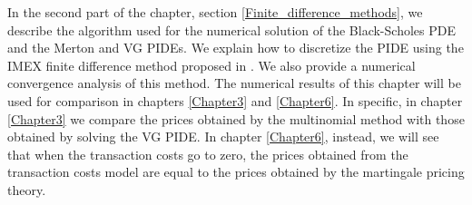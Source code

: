 In the second part of the chapter, section \ref{Finite_difference_methods}, we describe the algorithm used for the numerical solution of the Black-Scholes PDE and the
Merton and VG PIDEs.
We explain how to discretize the PIDE using the IMEX finite difference method proposed in \cite{CoVo05b}. We also provide a numerical convergence analysis of this method.
The numerical results of this chapter will be used for comparison in chapters \ref{Chapter3} and \ref{Chapter6}.
In specific, in chapter \ref{Chapter3} we compare the prices obtained by the multinomial method with those obtained by solving the VG PIDE.  
In chapter \ref{Chapter6}, instead, we will see that when the transaction costs go to zero, 
the prices obtained from the transaction costs model are equal to the prices obtained by the martingale pricing theory.

